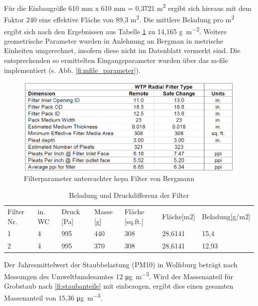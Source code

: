     Für die Einbaugröße 610 mm x 610 mm = 0,3721 \si{\square\meter} ergibt sich hieraus mit dem Faktor 240 eine effektive Fläche von 89,3 \si{\square\meter}. Die mittlere Beladung pro \si{\square\meter} ergibt sich nach den Ergebnissen aus Tabelle \ref{tab:beladungE11} zu 14,165 \si{ \gram\per\square\metre}. Weitere geometrische Parameter wurden in Anlehnung an Bergman in metrische Einheiten umgerechnet, insofern diese nicht im Datenblatt vermerkt sind. Die entsprechenden so ermittelten Eingangsparameter wurden über das m-file implementiert (s. Abb. \ref{fi:mfile_parameter}).
\begin{figure}[H]
    \begin{center}
        \includegraphics[width=\linewidth]{images/filter_dimensionen.png}
        \caption[Parameter HEPA Filter Bergmann]{Filterparameter untersuchter \ac{hepa} Filter von Bergmann \cite{hepa}}
        \label{fi:filterparameter}
    \end{center}
\end{figure}
\begin{table}[]
    \caption{Beladung und Druckdifferenz der Filter}
    \begin{tabular}{lllllll}
    Filter Nr. & in. WC & Druck {[}Pa{]} & Masse {[}g{]} & Fläche {[}sq.ft.{]} & Fläche{[}m2{]} & Beladung{[}g/m2{]} \\
    1          & 4      & 995            & 440           & 308                 & 28,6141        & 15,4               \\
    2          & 4      & 995            & 370           & 308                 & 28,6141        & 12,93             
    \end{tabular}
    \label{tab:beladungE11}
    \end{table}
Der Jahresmittelwert der  Staubbelastung (PM10) in Wolfsburg beträgt nach Messungen des Umweltbundesamtes 12 \si{\micro\gram\per\cubic\metre}. Wird der Massenanteil für Grobstaub nach \ref{fi:staubanteile} mit einbezogen, ergibt dies einen gesamten Massenanteil von 15,36 \si{\micro\gram\per\cubic\metre}.
